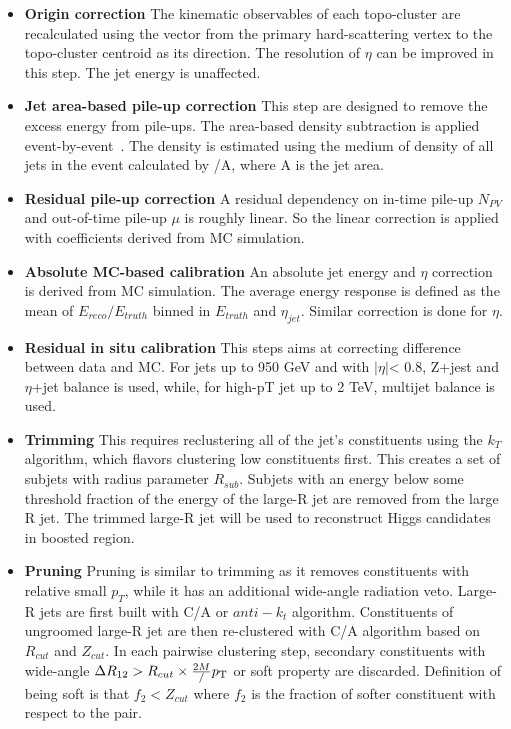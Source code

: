 \begin{itemize}
\item \textbf{Origin correction} The kinematic observables of each topo-cluster are recalculated using the vector from the primary hard-scattering vertex to the topo-cluster centroid as its direction. The resolution of $\eta$ can be improved in this step. The jet energy is unaffected.
\item \textbf{Jet area-based pile-up correction} This step are designed to remove the excess energy from pile-ups. The area-based \pt density subtraction is applied event-by-event~\cite{Cacciari:2007fd}. The \pt density is estimated using the medium of \pt density of all jets in the event calculated by \pt/A, where A is the jet area.
\item  \textbf{Residual pile-up correction} A residual \pt  dependency on in-time pile-up $N_{PV}$ and out-of-time pile-up $\mu$ is roughly linear. So the linear correction is applied with coefficients derived from MC simulation.  
\item \textbf{Absolute MC-based calibration} An absolute jet energy and $\eta$ correction is derived from MC simulation. The average energy response is defined as the mean of $E_{reco}/E_{truth}$ binned in $E_{truth}$ and $\eta_{jet}$. Similar correction is done for $\eta$. 
\item \textbf{Residual in situ calibration} This steps aims at correcting difference between data and MC. For jets up to 950 GeV and with $|\eta|$< 0.8, Z+jest and $\eta$+jet balance is used, while, for high-pT jet  up to 2 TeV, multijet balance is used.
\end{itemize}

\begin{itemize}
\item \textbf{Trimming} This requires reclustering all of the jet’s constituents using the $k_T$ algorithm, which flavors clustering low \pt constituents first. This creates a set of subjets with radius parameter $R_{sub}$. Subjets with an energy below some threshold fraction of the energy of the large-R jet are removed from the large R jet. The trimmed large-R jet will be used to reconstruct Higgs candidates in boosted region.
\item \textbf{Pruning} Pruning is similar to trimming as it removes constituents with relative small $p_T$, while it has an additional wide-angle radiation veto. Large-R jets are first built with C/A or $anti-k_t$  algorithm. Constituents of ungroomed large-R jet are then re-clustered with C/A algorithm based on $R_{cut}$ and $Z_{cut}$. In each pairwise clustering step, secondary constituents with wide-angle $\Delta R_{12} > R_{cut} \times \frac{2M}/p_{\mathrm{T}}$ or soft property are discarded. Definition of being soft is that $f_2 < Z_{cut}$ where $f_2$ is the fraction of softer constituent \pt with respect to the pair.

\end{itemize}


